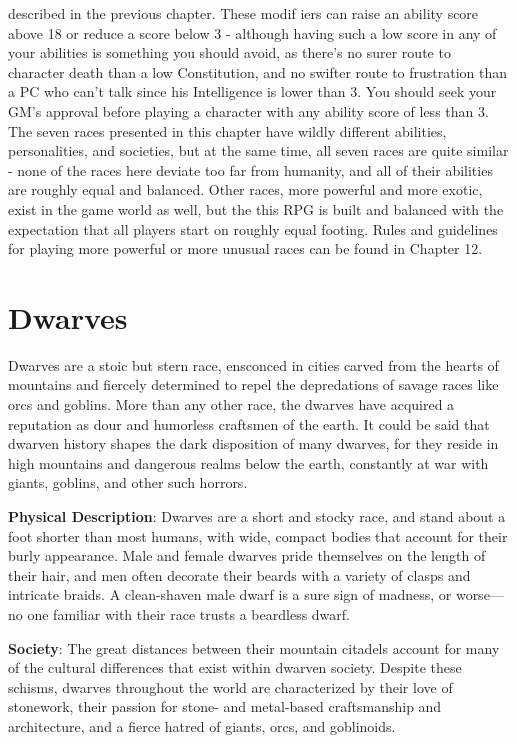 described in the previous chapter. These modif iers can
raise an ability score above 18 or reduce a score below
3 - although having such a low score in any of your
abilities is something you should avoid, as there's no
surer route to character death than a low Constitution,
and no swifter route to frustration than a PC who can't
talk since his Intelligence is lower than 3. You should
seek your GM's approval before playing a character with
any ability score of less than 3.\\
The seven races presented in this chapter have wildly
different abilities, personalities, and societies, but at the
same time, all seven races are quite similar - none of the
races here deviate too far from humanity, and all of their
abilities are roughly equal and balanced. Other races, more
powerful and more exotic, exist in the game world as well,
but the this RPG is built and balanced with the
expectation that all players start on roughly equal footing.
Rules and guidelines for playing more powerful or more
unusual races can be found in Chapter 12.
\section{Dwarves}

\label{f0}				
Dwarves are a stoic but stern race, ensconced in cities carved from the hearts of mountains and fiercely determined to repel the depredations of savage races like orcs and goblins. More than any other race, the dwarves have acquired a reputation as dour and humorless craftsmen of the earth. It could be said that dwarven history shapes the dark disposition of many dwarves, for they reside in high mountains and dangerous realms below the earth, constantly at war with giants, goblins, and other such horrors. 
				
\textbf{Physical Description}: Dwarves are a short and stocky race, and stand about a foot shorter than most humans, with wide, compact bodies that account for their burly appearance. Male and female dwarves pride themselves on the length of their hair, and men often decorate their beards with a variety of clasps and intricate braids. A clean-shaven male dwarf is a sure sign of madness, or worse---no one familiar with their race trusts a beardless dwarf.
				
\textbf{Society}: The great distances between their mountain citadels account for many of the cultural differences that exist within dwarven society. Despite these schisms, dwarves throughout the world are characterized by their love of stonework, their passion for stone- and metal-based craftsmanship and architecture, and a fierce hatred of giants, orcs, and goblinoids.
				
